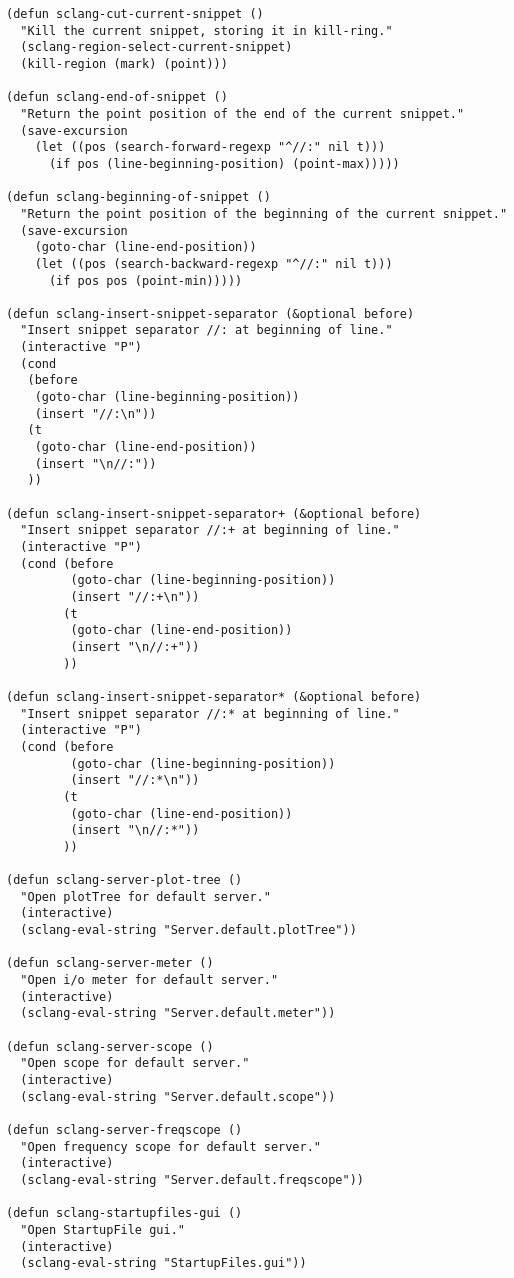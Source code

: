 \documentclass[11pt]{article}
\begin{document}
\begin{verbatim}
(defun sclang-cut-current-snippet ()
  "Kill the current snippet, storing it in kill-ring."
  (sclang-region-select-current-snippet)
  (kill-region (mark) (point)))

(defun sclang-end-of-snippet ()
  "Return the point position of the end of the current snippet."
  (save-excursion
    (let ((pos (search-forward-regexp "^//:" nil t)))
      (if pos (line-beginning-position) (point-max)))))

(defun sclang-beginning-of-snippet ()
  "Return the point position of the beginning of the current snippet."
  (save-excursion
    (goto-char (line-end-position))
    (let ((pos (search-backward-regexp "^//:" nil t)))
      (if pos pos (point-min)))))

(defun sclang-insert-snippet-separator (&optional before)
  "Insert snippet separator //: at beginning of line."
  (interactive "P")
  (cond
   (before
    (goto-char (line-beginning-position))
    (insert "//:\n"))
   (t
    (goto-char (line-end-position))
    (insert "\n//:"))
   ))

(defun sclang-insert-snippet-separator+ (&optional before)
  "Insert snippet separator //:+ at beginning of line."
  (interactive "P")
  (cond (before
         (goto-char (line-beginning-position))
         (insert "//:+\n"))
        (t
         (goto-char (line-end-position))
         (insert "\n//:+"))
        ))

(defun sclang-insert-snippet-separator* (&optional before)
  "Insert snippet separator //:* at beginning of line."
  (interactive "P")
  (cond (before
         (goto-char (line-beginning-position))
         (insert "//:*\n"))
        (t
         (goto-char (line-end-position))
         (insert "\n//:*"))
        ))

(defun sclang-server-plot-tree ()
  "Open plotTree for default server."
  (interactive)
  (sclang-eval-string "Server.default.plotTree"))

(defun sclang-server-meter ()
  "Open i/o meter for default server."
  (interactive)
  (sclang-eval-string "Server.default.meter"))

(defun sclang-server-scope ()
  "Open scope for default server."
  (interactive)
  (sclang-eval-string "Server.default.scope"))

(defun sclang-server-freqscope ()
  "Open frequency scope for default server."
  (interactive)
  (sclang-eval-string "Server.default.freqscope"))

(defun sclang-startupfiles-gui ()
  "Open StartupFile gui."
  (interactive)
  (sclang-eval-string "StartupFiles.gui"))


\end{verbatim}
\end{document}

